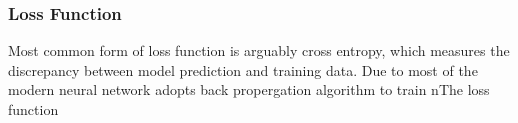 \subsubsection{Loss Function}

Most common form of loss function is arguably cross entropy, which measures the discrepancy between model prediction and training data. Due to most of the modern neural network adopts back propergation algorithm to train nThe loss function 